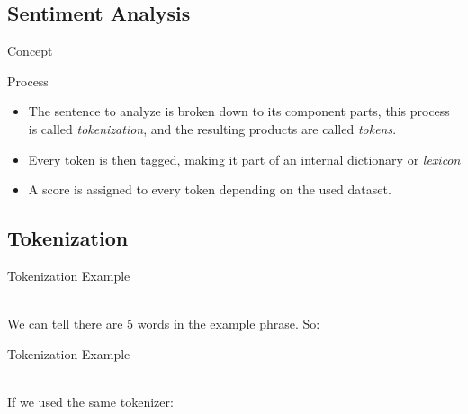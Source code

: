 \documentclass[11pt]{beamer}
\begin{document}
\subsection{Sentiment Analysis}
\begin{frame}{Concept}
	\begin{block}{Process}
		\begin{itemize}
		\item The sentence to analyze is broken down to its component parts, this process is called \textit{tokenization}, and the resulting products are called \textit{tokens}.
		\item Every token is then tagged, making it part of an internal dictionary or \textit{lexicon}
		\item A score is assigned to every token depending on the used dataset.
		\end{itemize}
	\end{block}
\end{frame}

\subsection{Tokenization}
\begin{frame}{Tokenization Example}
	\begin{center}
	\\
	\vspace*{2cm}
	We can tell there are 5 words in the example phrase. So:\\
	\end{center}
\end{frame}
\begin{frame}{Tokenization Example}
	\begin{center}
	\\
	\vspace*{2cm}
	If we used the same tokenizer:\\
	\end{center}
\end{frame}
\end{document}
